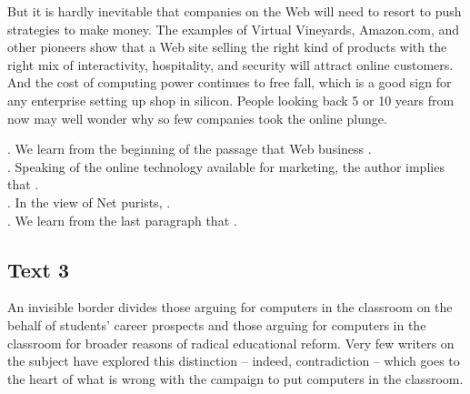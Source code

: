 But it is hardly inevitable that companies on the Web will need to resort to push strategies to make money. The examples of Virtual Vineyards, Amazon.com, and other pioneers show that a Web site selling the right kind of products with the right mix of interactivity, hospitality, and security will attract online customers. And the cost of computing power continues to free fall, which is a good sign for any enterprise setting up shop in silicon. People looking back 5 or 10 years from now may well wonder why so few companies took the online plunge.
\begin{questions}  .	We learn from the beginning of the passage that Web business \ltk{}.\\
 .	Speaking of the online technology available for marketing, the author implies that \ltk{}.\\
 .	In the view of Net purists, \ltk{}.\\
 .	We learn from the last paragraph that \ltk{}.\\
\end{questions}    \subsection{Text 3}
An invisible border divides those arguing for computers in the classroom on the behalf of students’ career prospects and those arguing for computers in the classroom for broader reasons of radical educational reform. Very few writers on the subject have explored this distinction -- indeed, contradiction -- which goes to the heart of what is wrong with the campaign to put computers in the classroom.

